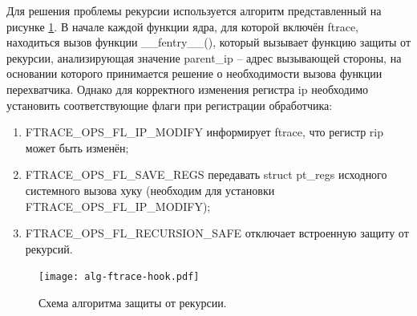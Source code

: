 





    Для решения проблемы рекурсии используется алгоритм представленный на рисунке \ref{schema:ftrace:hook:alg}.
    В начале каждой функции ядра, для которой включён ftrace,
    находиться вызов функции \_\_fentry\_\_(),
    который вызывает функцию защиты от рекурсии,
    анализирующая значение parent\_ip -- адрес вызывающей стороны,
    на основании которого
    принимается решение о необходимости вызова функции перехватчика.
    Однако для корректного изменения регистра ip необходимо установить соответствующие флаги
    при регистрации обработчика:
    \begin{enumerate}
        \item FTRACE\_OPS\_FL\_IP\_MODIFY информирует ftrace, что регистр rip может быть изменён;
        \item FTRACE\_OPS\_FL\_SAVE\_REGS передавать struct pt\_regs исходного системного вызова хуку 
            (необходим для установки FTRACE\_OPS\_FL\_IP\_MODIFY);
        \item FTRACE\_OPS\_FL\_RECURSION\_SAFE отключает встроенную защиту от рекурсий.
    \end{enumerate}

    \begin{figure}[h!]
        \centering
        \texttt{[image: alg-ftrace-hook.pdf]}
        \caption{Схема алгоритма защиты от рекурсии.}
        \label{schema:ftrace:hook:alg}
    \end{figure}

